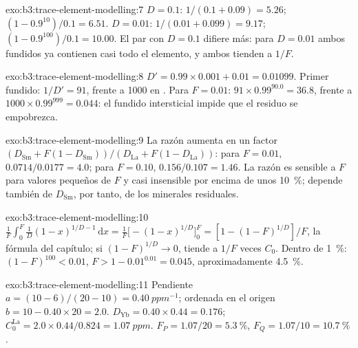 \begin{solution}{exo:b3:trace-element-modelling:7}
$D = 0.1$:  $1/(0.1 + 0.09) = 5.26$;  $(1 - 0.9^{10})/0.1 =
6.51$. $D = 0.01$:  $1/(0.01 + 0.099) = 9.17$; 
$(1 - 0.9^{100})/0.1 = 10.00$. El par con $D = 0.1$ difiere más: para
$D = 0.01$ ambos fundidos ya contienen casi todo el elemento, y ambos tienden a
$1/F$.
\end{solution}

\begin{solution}{exo:b3:trace-element-modelling:8}
$D' = 0.99\times0.001 + 0.01 = 0.01099$. Primer fundido: $1/D' = 91$, frente a
1000 en . Para $F = 0.01$: $91\times0.99^{90.0} = 36.8$,
frente a $1000\times0.99^{999} = 0.044$: el fundido intersticial impide que el residuo
se empobrezca.
\end{solution}

\begin{solution}{exo:b3:trace-element-modelling:9}
La razón aumenta en un factor $(D_{\mathrm{Sm}} + F(1 - D_{\mathrm{Sm}}))/(D_{\mathrm{La}}
+ F(1 - D_{\mathrm{La}}))$: para $F = 0.01$, $0.0714/0.0177 = 4.0$; para $F = 0.10$,
$0.156/0.107 = 1.46$. La razón es sensible a $F$ para valores pequeños de $F$ y casi
insensible por encima de unos \qty{10}{\percent}; depende también de $D_{\mathrm{Sm}}$,
por tanto, de los minerales residuales.
\end{solution}

\begin{solution}{exo:b3:trace-element-modelling:10}
$\frac1F\int_0^F \frac1D(1 - x)^{1/D - 1}\,\mathrm dx = \frac1F\bigl[-(1 -
x)^{1/D}\bigr]_0^F = [1 - (1 - F)^{1/D}]/F$, la fórmula del capítulo; si
$(1 - F)^{1/D} \to 0$, tiende a $1/F$ veces $C_0$. Dentro de \qty{1}{\percent}:
$(1 - F)^{100} < 0.01$, $F > 1 - 0.01^{0.01} = 0.045$, aproximadamente
\qty{4.5}{\percent}.
\end{solution}

\begin{solution}{exo:b3:trace-element-modelling:11}
Pendiente $a = (10 - 6)/(20 - 10) = \qty{0.40}{ppm^{-1}}$; ordenada en el origen $b = 10 -
0.40\times20 = 2.0$. $D_{\mathrm{Yb}} = 0.40\times0.44 = 0.176$;
$C_0^{\mathrm{La}} = 2.0\times0.44/0.824 = \qty{1.07}{ppm}$. $F_P = 1.07/20 =
\qty{5.3}{\percent}$, $F_Q = 1.07/10 = \qty{10.7}{\percent}$.
\end{solution}

